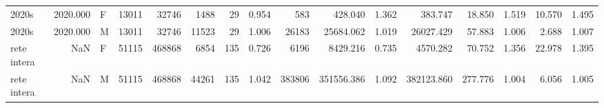 \begin{table}
\begin{tabular}{lrlrrrrrrrrrrrrr}
      2020s &  2020.000 &         F & 13011 &  32746 &         1488 &      29 &                 0.954 &        583 &          428.040 &              1.362 &       383.747 &    18.850 &           1.519 &   10.570 &                    1.495 \\
      2020s &  2020.000 &         M & 13011 &  32746 &        11523 &      29 &                 1.006 &      26183 &        25684.062 &              1.019 &     26027.429 &    57.883 &           1.006 &    2.688 &                    1.007 \\
rete intera &       NaN &         F & 51115 & 468868 &         6854 &     135 &                 0.726 &       6196 &         8429.216 &              0.735 &      4570.282 &    70.752 &           1.356 &   22.978 &                    1.395 \\
rete intera &       NaN &         M & 51115 & 468868 &        44261 &     135 &                 1.042 &     383806 &       351556.386 &              1.092 &    382123.860 &   277.776 &           1.004 &    6.056 &                    1.005 \\
\bottomrule
\end{tabular}
\end{table}
